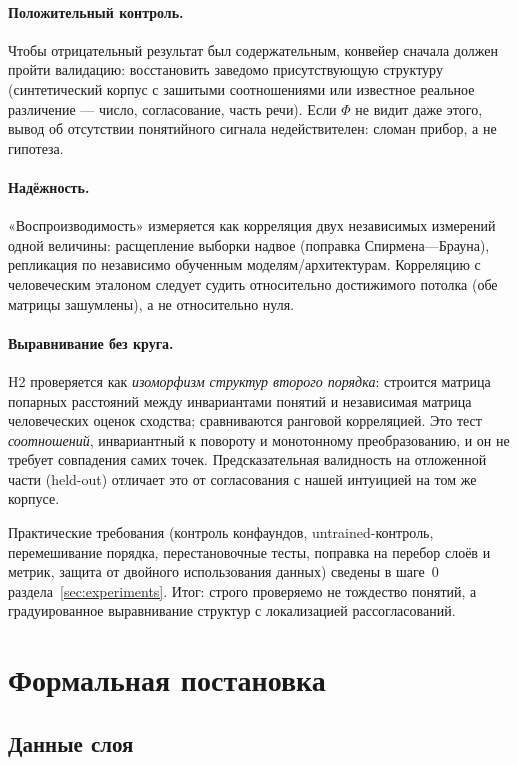 \documentclass[11pt,a4paper]{article}
\theoremstyle{definition}
\theoremstyle{plain}
\begin{document}
\paragraph{Положительный контроль.} Чтобы отрицательный результат был содержательным, конвейер
сначала должен пройти валидацию: восстановить заведомо присутствующую структуру (синтетический
корпус с зашитыми соотношениями или известное реальное различение — число, согласование,
часть речи). Если $\Phi$ не видит даже этого, вывод об отсутствии понятийного сигнала
недействителен: сломан прибор, а не гипотеза.

\paragraph{Надёжность.} «Воспроизводимость» измеряется как корреляция двух независимых
измерений одной величины: расщепление выборки надвое (поправка Спирмена—Брауна), репликация по
независимо обученным моделям/архитектурам. Корреляцию с человеческим эталоном следует судить
относительно достижимого потолка (обе матрицы зашумлены), а не относительно нуля.

\paragraph{Выравнивание без круга.} H2 проверяется как \emph{изоморфизм структур второго
порядка}: строится матрица попарных расстояний между инвариантами понятий и независимая матрица
человеческих оценок сходства; сравниваются ранговой корреляцией. Это тест \emph{соотношений},
инвариантный к повороту и монотонному преобразованию, и он не требует совпадения самих точек.
Предсказательная валидность на отложенной части (held-out) отличает это от согласования с нашей
интуицией на том же корпусе.

Практические требования (контроль конфаундов, untrained-контроль, перемешивание порядка,
перестановочные тесты, поправка на перебор слоёв и метрик, защита от двойного использования
данных) сведены в шаге~0 раздела~\ref{sec:experiments}. Итог: строго проверяемо не тождество
понятий, а градуированное выравнивание структур с локализацией рассогласований.

\section{Формальная постановка}

\subsection{Данные слоя}
\end{document}
